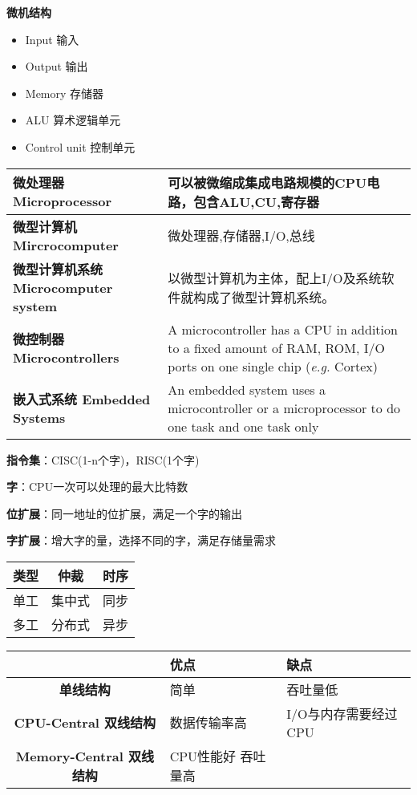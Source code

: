 \textbf{微机结构}
\begin{itemize}
	\item Input 输入
	\item Output 输出
	\item Memory 存储器
	\item ALU 算术逻辑单元
	\item Control unit 控制单元
\end{itemize}

\begin{table*}
	\centering
	\caption{微机概念差异}
\begin{tabular}{|>{\bfseries}l|p{8cm}|}
	\hline
	微处理器 Microprocessor & 可以被微缩成集成电路规模的CPU电路，包含ALU,CU,寄存器 \\
	\hline
	微型计算机 Mircrocomputer & 微处理器,存储器,I/O,总线 \\
	\hline
	微型计算机系统 Microcomputer system & 以微型计算机为主体，配上I/O及系统软件就构成了微型计算机系统。 \\
	\hline
	微控制器 Microcontrollers & A microcontroller has a CPU in addition to a fixed amount of RAM, ROM, I/O ports on one single chip (\emph{e.g.} Cortex) \\
	\hline
	嵌入式系统 Embedded Systems & An embedded system uses a microcontroller or a microprocessor to do one task and one task only\\
	\hline
\end{tabular}
\end{table*}

\textbf{指令集}：CISC(1-n个字)，RISC(1个字)

\textbf{字}：CPU一次可以处理的最大比特数

\textbf{位扩展}：同一地址的位扩展，满足一个字的输出

\textbf{字扩展}：增大字的量，选择不同的字，满足存储量需求

\begin{table*}
	\begin{minipage}{0.3\textwidth}
		\centering
		\caption{总线类型}
		\begin{tabular}{|c|c|c|}
			\hline
			\bfseries 类型 &\bfseries 仲裁 &\bfseries 时序 \\
			\hline
			单工 & 集中式 & 同步 \\
			多工 & 分布式 & 异步 \\
			\hline
		\end{tabular}
	\end{minipage}
	\begin{minipage}{0.7\textwidth}
		\centering
		\caption{总线结构}
		\begin{tabular}{|>{\bfseries}c|l|l|}
			\hline
			& \bfseries 优点 &\bfseries 缺点 \\
			\hline
			单线结构 & 简单 & 吞吐量低 \\
			\hline
			CPU-Central 双线结构 & 数据传输率高 & I/O与内存需要经过CPU \\
			\hline
			Memory-Central 双线结构 & CPU性能好 吞吐量高 &  \\
			\hline
		\end{tabular}
	\end{minipage}
\end{table*}

